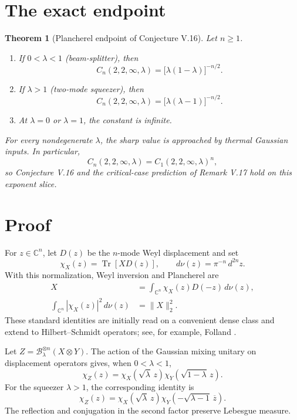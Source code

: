 \documentclass[11pt]{article}
\newtheorem{theorem}{Theorem}
\newcommand{\C}{\mathbb C}
\newcommand{\Tr}{\operatorname{Tr}}
\newcommand{\Bcal}{\mathcal B}
\begin{document}
\section{The exact endpoint}

\begin{theorem}[Plancherel endpoint of Conjecture V.16]\label{thm:endpoint}
Let $n\ge1$.
\begin{enumerate}[label=\textup{(\roman*)}]
\item If $0<\lambda<1$ (beam-splitter), then
\[
 C_n(2,2,\infty,\lambda)
 =\bigl[\lambda(1-\lambda)\bigr]^{-n/2}.
\]
\item If $\lambda>1$ (two-mode squeezer), then
\[
 C_n(2,2,\infty,\lambda)
 =\bigl[\lambda(\lambda-1)\bigr]^{-n/2}.
\]
\item At $\lambda=0$ or $\lambda=1$, the constant is infinite.
\end{enumerate}
For every nondegenerate $\lambda$, the sharp value is approached by thermal
Gaussian inputs.  In particular,
\[
 C_n(2,2,\infty,\lambda)=C_1(2,2,\infty,\lambda)^n,
\]
so Conjecture V.16 and the critical-case prediction of Remark V.17 hold on
this exponent slice.
\end{theorem}

\section{Proof}

For $z\in\C^n$, let $D(z)$ be the $n$-mode Weyl displacement and set
\[
 \chi_X(z)=\Tr[X D(z)],
 \qquad d\nu(z)=\pi^{-n}\,d^{2n}z.
\]
With this normalization, Weyl inversion and Plancherel are
\begin{align}
 X&=\int_{\C^n}\chi_X(z)D(-z)\,d\nu(z),\label{eq:inv}\\
 \int_{\C^n}|\chi_X(z)|^2\,d\nu(z)&=\|X\|_2^2.\label{eq:planch}
\end{align}
These standard identities are initially read on a convenient dense class and
extend to Hilbert--Schmidt operators; see, for example, Folland
\cite{Folland1989}.

Let $Z=\Bcal_\lambda^{\otimes n}(X\otimes Y)$.  The action of the Gaussian
mixing unitary on displacement operators gives, when $0<\lambda<1$,
\begin{equation}\label{eq:beam-char}
 \chi_Z(z)=\chi_X(\sqrt\lambda\,z)
           \chi_Y(\sqrt{1-\lambda}\,z).
\end{equation}
For the squeezer $\lambda>1$, the corresponding identity is
\begin{equation}\label{eq:squeeze-char}
 \chi_Z(z)=\chi_X(\sqrt\lambda\,z)
           \chi_Y(-\sqrt{\lambda-1}\,\overline z).
\end{equation}
The reflection and conjugation in the second factor preserve Lebesgue measure.
\end{document}
